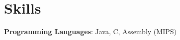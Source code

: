 \section{Skills}
 \begin{itemize}[leftmargin=0.15in, label={}]
    \small{\item{
     \textbf{Programming Languages}{: Java, C, Assembly (MIPS)} \\
    }}
 \end{itemize}
